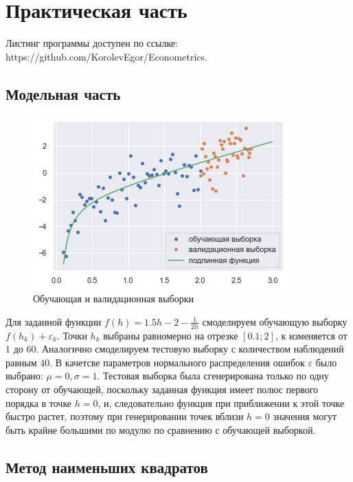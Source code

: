 \documentclass[a4paper,12pt]{article}
\begin{document}
\section{Практическая часть}

Листинг программы доступен по ссылке: https://github.com/KorolevEgor/Econometrics.

\subsection{Модельная часть}

\begin{figure} 
    \vspace{-4ex}
    \includegraphics[width=\linewidth]{src/img/сгенерированная_выборка.png}
    \caption{Обучающая и валидационная выборки}
\end{figure}

Для заданной функции $f(h) = 1.5h - 2 - \frac{1}{2h}$ смоделируем обучающую выборку $f(h_k) + \varepsilon_k$. Точки $h_k$ выбраны равномерно на отрезке $[0.1;2]$, $к$ изменяется от $1$ до $60$. Аналогично смоделируем тестовую выборку с количеством наблюдений равным $40$. В качетсве параметров нормального распределения ошибок $\varepsilon$ было выбрано: $\mu=0, \sigma = 1$. Тестовая выборка была сгенерирована только по одну сторону от обучающей, поскольку заданная функция имеет полюс первого порядка в точке $h = 0$, и, следовательно функция при приближении к этой точке быстро растет, поэтому при генерировании точек вблизи $h=0$ значения могут быть крайне большими по модулю по сравнению с обучающей выборкой.
\newpage

\subsection{Метод наименьших квадратов}
\end{document}

